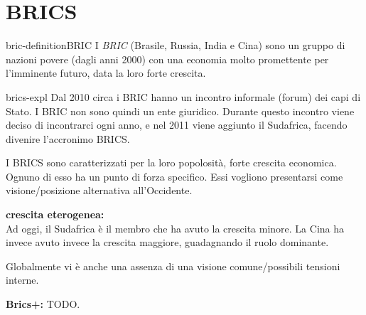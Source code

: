 \documentclass[preview]{standalone}
\begin{document}
\genpage

\section{BRICS}

\begin{snippetdefinition}{bric-definition}{BRIC}
    I \textit{BRIC} (Brasile, Russia, India e Cina)
    sono un gruppo di nazioni povere (dagli anni 2000) con una economia
    molto promettente per l'imminente futuro, data la loro forte crescita. 
\end{snippetdefinition}

\begin{snippet}{brics-expl}
    Dal 2010 circa i BRIC hanno un incontro informale (forum) dei capi di Stato.
    I BRIC non sono quindi un ente giuridico.
    Durante questo incontro viene deciso di incontrarci ogni anno, e nel 2011 viene aggiunto il Sudafrica,
    facendo divenire l'accronimo BRICS.
    
    I BRICS sono caratterizzati per la loro popolosità, forte crescita economica.
    Ognuno di esso ha un punto di forza specifico.
    Essi vogliono presentarsi come visione/posizione alternativa all'Occidente.
    
    \textbf{crescita eterogenea:} \\
    Ad oggi, il Sudafrica è il membro che ha avuto la crescita minore.
    La Cina ha invece avuto invece la crescita maggiore, guadagnando il ruolo dominante.
    
    Globalmente vi è anche una assenza di una visione comune/possibili tensioni interne.
    
    \textbf{Brics+:} TODO.
\end{snippet}
\end{document}
